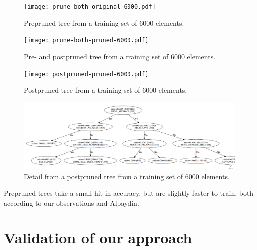 \documentclass[a4paper,10pt]{article}
\begin{document}
\begin{figure}[h]
  \centering
  \begin{minipage}[c]{1.0\textwidth}
    \centering

\texttt{[image: prune-both-original-6000.pdf]}
  \end{minipage}
  \caption{Prepruned tree from a training set of 6000 elements.}
  \label{fig:prune-both-original-6000}
\end{figure}

\begin{figure}[h]
  \centering
  \begin{minipage}[c]{1.0\textwidth}
    \centering

\texttt{[image: prune-both-pruned-6000.pdf]}
  \end{minipage}
  \caption{Pre- and postpruned tree from a training set of 6000 elements.}
  \label{fig:prune-both-pruned-6000}
\end{figure}

\begin{figure}[h]
  \centering
  \begin{minipage}[c]{1.0\textwidth}
    \centering
\texttt{[image: postpruned-pruned-6000.pdf]}
  \end{minipage}
  \caption{Postpruned tree from a training set of 6000 elements.}
  \label{fig:postpruned-6000}
\end{figure}

\begin{figure}[h]
  \centering
  \begin{minipage}[c]{1.0\textwidth}
    \centering
\includegraphics[width=130mm]{detail-postpruned-pruned-6000.png}
  \end{minipage}
  \caption{Detail from a postpruned tree from a training set of 6000 elements.}
  \label{fig:detail-postpruned-6000}
\end{figure}

Prepruned trees take a small hit in accuracy, but are slightly faster to
train, both according to our observations and
Alpaydin\cite[p. 182]{alpaydin2004}.

\section{Validation of our approach}
\end{document}
